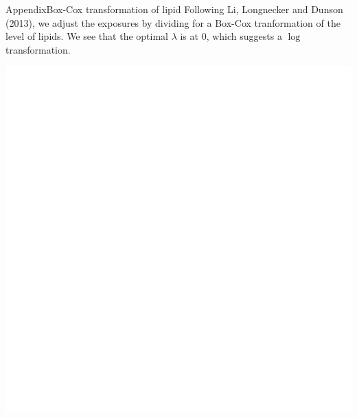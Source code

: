 \documentclass{beamer}\usepackage[]{graphicx}\usepackage[]{color}
\makeatletter
\def\maxwidth{ %
  \ifdim\Gin@nat@width>\linewidth
    \linewidth
  \else
    \Gin@nat@width
  \fi
}
\newenvironment{kframe}{%
 \def\at@end@of@kframe{}%
 \ifinner\ifhmode%
  \def\at@end@of@kframe{\end{minipage}}%
  \begin{minipage}{\columnwidth}%
 \fi\fi%
 \def\FrameCommand##1{\hskip\@totalleftmargin \hskip-\fboxsep
 \colorbox{shadecolor}{##1}\hskip-\fboxsep
     \hskip-\linewidth \hskip-\@totalleftmargin \hskip\columnwidth}%
 \MakeFramed {\advance\hsize-\width
   \@totalleftmargin\z@ \linewidth\hsize
   \@setminipage}}%
 {\par\unskip\endMakeFramed%
 \at@end@of@kframe}
\newenvironment{knitrout}{}{} %
\makeatother
\begin{document}
\begin{frame}{Appendix}{Box-Cox transformation of lipid}
Following Li, Longnecker and Dunson (2013), we adjust the exposures by dividing for a Box-Cox tranformation of the level of lipids. We see that the optimal $\lambda$ is at 0, which suggests a $\log$ transformation. 
\begin{knitrout}
\color{fgcolor}\begin{kframe}


{\ttfamily\noindent\bfseries{}}

{\ttfamily\noindent\bfseries{}}\end{kframe}
\includegraphics[width=\maxwidth]{figure/unnamed-chunk-5-1} 

\end{knitrout}


\end{frame}
\end{document}
